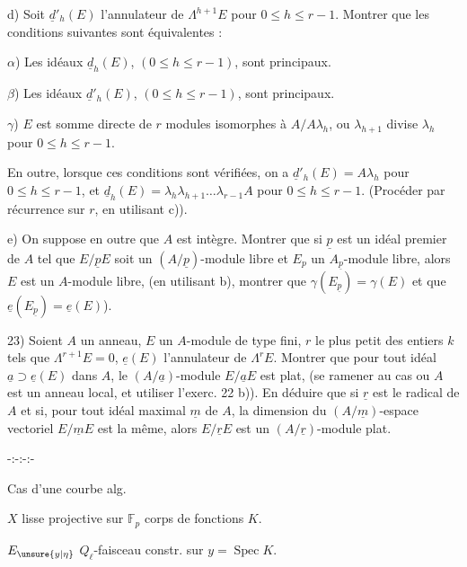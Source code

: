 d) Soit $\underline d'_h(E)$ l'annulateur de $\Lambda^{h+1}E$ pour $0\leq h\leq r-1$. Montrer que les conditions suivantes sont équivalentes :

$\alpha$) Les idéaux $\underline d_h(E)$, $(0\leq h\leq r-1)$, sont principaux.

$\beta$) Les idéaux $\underline d'_h(E)$, $(0\leq h\leq r-1)$, sont principaux.

$\gamma$) $E$ est somme directe de $r$ modules isomorphes à $A/A\lambda_h$, o\rlap{\handwritten{\`{\phantom{u}}}}u $\lambda_{h+1}$ divise $\lambda_h$ pour $0\leq h\leq r-1$.

En outre, lorsque ces conditions sont vérifiées, on a $\underline d'_h(E)=A\lambda_h$ pour $0\leq h\leq r-1$, et $\underline d_h(E)=\lambda_h\lambda_{h+1}\ldots\lambda_{r-1}A$ pour $0\leq h\leq r-1$. (Procéder par récurrence sur $r$, en utilisant c)).

e) On suppose en outre que $A$ est intègre. Montrer que si $\underline p$ est un idéal premier de $A$ tel que $E/\underline p E$ soit un $(A/\underline p)$-module libre et $E_p$ un $A_{\underline p}$-module libre, alors $E$ est un $A$-module libre, (en utilisant b), montrer que $\gamma(E_{\underline p})=\gamma(E)$ et que $\underline e(E_{\underline p})=\underline e(E)$).

23) Soient $A$ un anneau, $E$ un $A$-module de type fini, $r$ le plus petit des entiers $k$ tels que $\Lambda^{r+1}E=0$, $\underline e(E)$ l'annulateur de $\Lambda^r E$. Montrer que pour tout idéal $\underline a\supset\underline e(E)$ dans $A$, le $(A/\underline a)$-module $E/\underline a E$ est plat, (se ramener au cas o\rlap{\handwritten{\`{\phantom{u}}}}u $A$ est un anneau local, et utiliser l'exerc. 22 b)). En déduire que si $\underline r$ est le radical de $A$ et si, pour tout idéal maximal $\underline m$ de $A$, la dimension du $(A/\underline m)$-espace vectoriel $E/\underline m E$ est la même, alors $E/\underline r E$ est un $(A/\underline r)$-module plat.

\begin{center}
-:-:-:-
\end{center}

Cas d'une courbe alg.

$X$  lisse projective  sur $\mathbb F_p$\unsure{,}  corps de fonctions $K$.

$E_{\unsure{y|\eta}}$ $Q_\ell$-faisceau constr. sur $y=\operatorname{Spec}K$.

